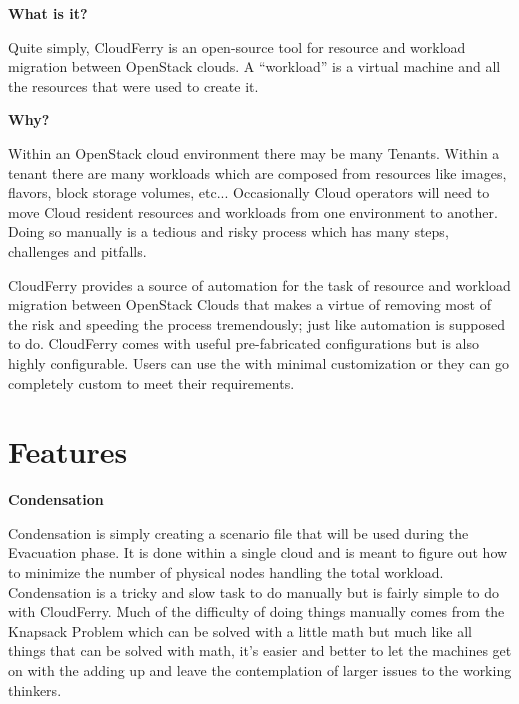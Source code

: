 \documentclass{article}
\begin{document}
\vspace{2pt}
{\large{}{\color{color03} \textbf{What is it?}}}

\vspace{2pt}
{\color{color03} Quite simply, CloudFerry is an open-source tool for resource and 
workload migration between OpenStack clouds. A ``workload'' is a virtual machine 
and all the resources that were used to create it. }

\vspace{2pt}
{\large{}{\color{color03} \textbf{Why?}}}

\vspace{2pt}
{\color{color03} Within an OpenStack cloud environment there may be many Tenants. 
Within a tenant there are many workloads which are composed from resources like 
images, flavors, block storage volumes, etc... Occasionally Cloud operators will 
need to move Cloud resident resources and workloads from one environment to another. 
Doing so manually is a tedious and risky process which has many steps, challenges 
and pitfalls. }

\vspace{2pt}
{\color{color03} CloudFerry provides a source of automation for the task of resource 
and workload migration between OpenStack Clouds that makes a virtue of removing 
most of the risk and speeding the process tremendously; just like automation is 
supposed to do. CloudFerry comes with useful pre-fabricated configurations but 
is also highly configurable. Users can use the with minimal customization or they 
can go completely custom to meet their requirements. }

\section*{{\Huge{}{\color{color04} Features}}}

{\large{}{\color{color03} \textbf{Condensation}}}

\vspace{2pt}
{\color{color03} Condensation is simply creating a scenario file that will be used 
during the Evacuation phase. It is done within a single cloud and is meant to figure 
out how to minimize the number of physical nodes handling the total workload. Condensation 
is a tricky and slow task to do manually but is fairly simple to do with CloudFerry. 
Much of the difficulty of doing things manually comes from the Knapsack Problem 
which can be solved with a little math but much like all things that can be solved 
with math, it's easier and better to let the machines get on with the adding up 
and leave the contemplation of larger issues to the working thinkers.}
\end{document}
